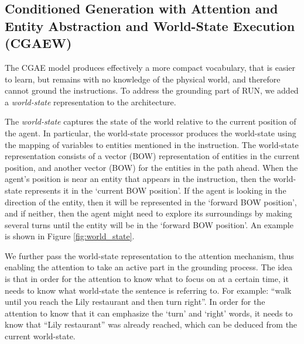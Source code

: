 \documentclass[11pt,a4paper]{article}
\begin{document}
\subsection{Conditioned Generation with Attention and Entity Abstraction and World-State Execution (CGAEW)} 

The CGAE model produces effectively  a more compact vocabulary, that is easier to learn,  but remains with no knowledge of the physical world, and therefore cannot ground the instructions.
To address the grounding part of RUN, we added a {\em world-state} representation  to the architecture. 

The {\em world-state} captures the state of the world relative to the current position of the agent.
In particular, the world-state processor produces the world-state using the mapping of 
variables to entities mentioned in the instruction. The world-state representation  %
consists of a vector (BOW) representation of entities in the current position, and another  vector (BOW) for the entities in the path ahead. 
When the agent's position is near an entity that appears in the instruction, then the world-state represents it in the \enquote*{current BOW position}. If the agent is looking in the direction of the entity, then it will be represented in the \enquote*{forward BOW position}, and if neither, then the agent might need to explore its surroundings by making several turns until the entity will be  in the \enquote*{forward BOW position}. An example is shown in Figure \ref{fig:world_state}.  


We further pass the world-state representation to the attention mechanism, thus enabling the attention to take an active part in the grounding process. The idea is that in order for the attention to know what to focus on at a certain time, it needs to know what world-state the sentence is referring to. For example: \enquote{walk until you reach the Lily restaurant and then turn right}. In order for the attention to know that it can emphasize the \enquote*{turn} and \enquote*{right} words, it needs to know that \enquote{Lily restaurant} was already reached, which can be deduced from the current world-state.\par
\end{document}
